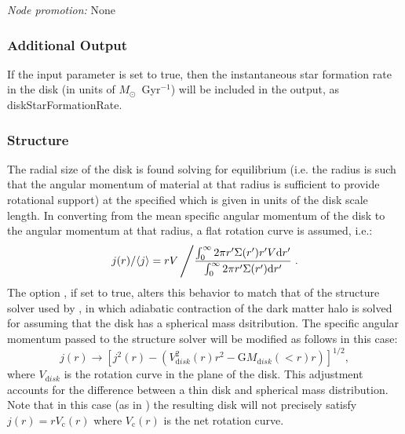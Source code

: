 \noindent\emph{Node promotion:} None\\

\subsubsection{Additional Output}

If the {\normalfont \ttfamily [diskOutputStarFormationRate]} input parameter is set to true, then the instantaneous star formation rate in the disk (in units of $M_\odot$~Gyr$^{-1}$) will be included in the output, as {\normalfont \ttfamily diskStarFormationRate}.

\subsubsection{Structure}

The radial size of the disk is found solving for equilibrium (i.e. the radius is such that the angular momentum of material at that radius is sufficient to provide rotational support) at the specified {\normalfont \ttfamily [diskStructureSolverRadius]} which is given in units of the disk scale length. In converting from the mean specific angular momentum of the disk to the angular momentum at that radius, a flat rotation curve is assumed, i.e.:
\begin{equation}
 j(r)/\langle j \rangle = r V \left/ {\int_0^\infty 2 \pi r^\prime \Sigma(r^\prime) r^\prime V {\mathrm d} r^\prime \over \int_0^\infty 2 \pi r^\prime \Sigma(r^\prime) {\mathrm d} r^\prime} \right. .
\end{equation}
The option {\normalfont {}}, if set to {\normalfont \ttfamily true}, alters this behavior to match that of the structure solver used by \cite{cole_hierarchical_2000}, in which adiabatic contraction of the dark matter halo is solved for assuming that the disk has a spherical mass dsitribution. The specific angular momentum passed to the structure solver will be modified as follows in this case:
\begin{equation}
 j(r) \rightarrow \left[ j^2(r) - \left( V_{\mathrm disk}^2(r) r^2 - {\mathrm G} M_{\mathrm disk}(<r) r \right) \right]^{1/2},
\end{equation}
where $V_{\mathrm disk}$ is the rotation curve in the plane of the disk. This adjustment accounts for the difference between a thin disk and spherical mass distribution. Note that in this case (as in \citealt{cole_hierarchical_2000}) the resulting disk will not precisely satisfy $j(r) = r V_{\mathrm c}(r)$ where $V_{\mathrm c}(r)$ is the net rotation curve.

